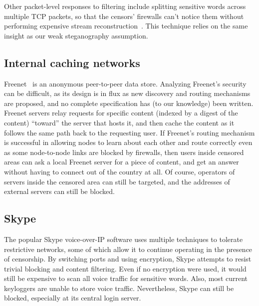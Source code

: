 \documentclass{llncs}
\begin{document}
Other packet-level responses to filtering include splitting
sensitive words across multiple TCP packets, so that the censors'
firewalls can't notice them without performing expensive stream
reconstruction~\cite{ptacek98insertion}. This technique relies on the
same insight as our weak steganography assumption.

\subsection{Internal caching networks}

Freenet~\cite{freenet-pets00} is an anonymous peer-to-peer data store.
Analyzing Freenet's security can be difficult, as its design is in flux as
new discovery and routing mechanisms are proposed, and no complete
specification has (to our knowledge) been written.  Freenet servers relay
requests for specific content (indexed by a digest of the content)
``toward'' the server that hosts it, and then cache the content as it
follows the same path back to
the requesting user.  If Freenet's routing mechanism is successful in
allowing nodes to learn about each other and route correctly even as some
node-to-node links are blocked by firewalls, then users inside censored areas
can ask a local Freenet server for a piece of content, and get an answer
without having to connect out of the country at all.  Of course, operators of
servers inside the censored area can still be targeted, and the addresses of
external servers can still be blocked.

\subsection{Skype}

The popular Skype voice-over-IP software uses multiple techniques to tolerate
restrictive networks, some of which allow it to continue operating in the
presence of censorship.  By switching ports and using encryption, Skype
attempts to resist trivial blocking and content filtering.  Even if no
encryption were used, it would still be expensive to scan all voice
traffic for sensitive words.  Also, most current keyloggers are unable to
store voice traffic.  Nevertheless, Skype can still be blocked, especially at
its central login server.
\end{document}
